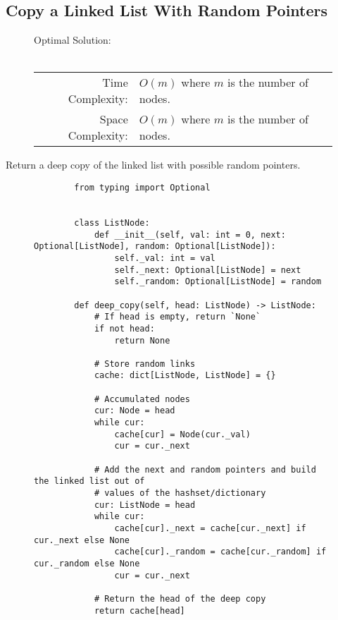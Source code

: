 
\subsection{Copy a Linked List With Random Pointers}

\begin{figure}[H]
    Optimal Solution:\\\\
    \begin{tabular}{rl}
        Time Complexity:& \(O(m)\) where \(m\) is the number of nodes.\\
        Space Complexity:& \(O(m)\) where \(m\) is the number of nodes.
    \end{tabular}
\end{figure}

Return a deep copy of the linked list with possible random pointers.

\begin{figure}[H]
    \centering
    \begin{verbatim}
        from typing import Optional


        class ListNode:
            def __init__(self, val: int = 0, next: Optional[ListNode], random: Optional[ListNode]):
                self._val: int = val
                self._next: Optional[ListNode] = next
                self._random: Optional[ListNode] = random

        def deep_copy(self, head: ListNode) -> ListNode:
            # If head is empty, return `None`
            if not head:
                return None

            # Store random links
            cache: dict[ListNode, ListNode] = {}

            # Accumulated nodes
            cur: Node = head
            while cur:
                cache[cur] = Node(cur._val)
                cur = cur._next

            # Add the next and random pointers and build the linked list out of
            # values of the hashset/dictionary
            cur: ListNode = head
            while cur:
                cache[cur]._next = cache[cur._next] if cur._next else None
                cache[cur]._random = cache[cur._random] if cur._random else None
                cur = cur._next

            # Return the head of the deep copy
            return cache[head]
    \end{verbatim}
\end{figure}
